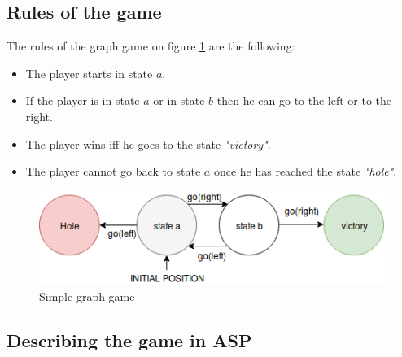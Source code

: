 
\subsection{Rules of the game}

The rules of the graph game on figure \ref{fig:agent} are the following:
\begin{itemize}
\item The player starts in state $a$.
\item If the player is in state $a$ or in state $b$ then he can go to the left or to the right.
\item The player wins iff he goes to the state \textit{"victory"}.
\item The player cannot go back to state $a$ once he has reached the state \textit{"hole"}.
\end{itemize}

\begin{figure}[h]
\centering
\includegraphics[width = 0.8\hsize]{figures/diagram1.png}
\caption{Simple graph game}
\label{fig:agent}
\end{figure}

\subsection{Describing the game in ASP}

